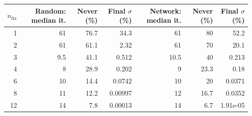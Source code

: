 \begin{tabular}{@{}rrrrrrr@{}}
\toprule
$n_{\mathrm{fix}}$ & Random: median it. & Never (\%) & Final $\sigma$ (\%) & Network: median it. & Never (\%) & Final $\sigma$ (\%) \\
\midrule
1 & 61 & 76.7 & 34.3 & 61 & 80 & 52.2 \\
2 & 61 & 61.1 & 2.32 & 61 & 70 & 20.1 \\
3 & 9.5 & 41.1 & 0.512 & 10.5 & 40 & 0.213 \\
4 & 8 & 28.9 & 0.202 & 9 & 23.3 & 0.18 \\
6 & 10 & 14.4 & 0.0742 & 10 & 20 & 0.0371 \\
8 & 11 & 12.2 & 0.00997 & 12 & 16.7 & 0.0352 \\
12 & 14 & 7.8 & 0.00013 & 14 & 6.7 & 1.91e-05 \\
\bottomrule
\end{tabular}
